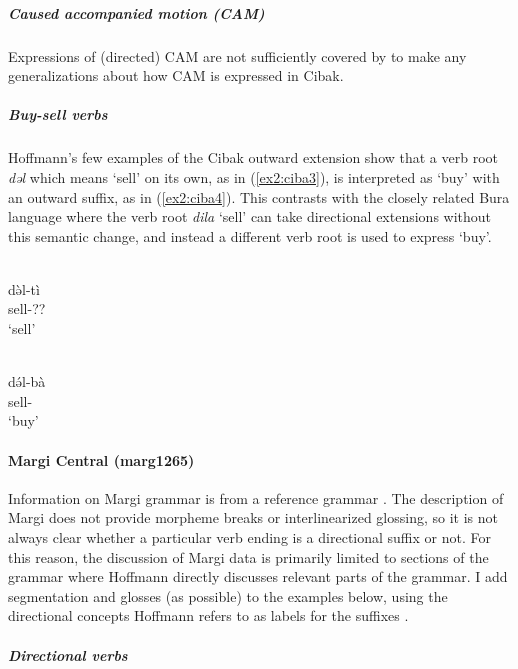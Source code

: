 \subparagraph{Caused accompanied motion (CAM)}

Expressions of (directed) CAM are not sufficiently covered by \citet{hoffmannZurSpracheCibak1955} to make any generalizations about how CAM is expressed in Cibak.

\subparagraph{Buy-sell verbs}

Hoffmann's few examples of the Cibak outward extension show that a verb root \textit{dəl} which means `sell' on its own, as in (\ref{ex2:ciba3}), is interpreted as `buy' with an outward suffix, as in (\ref{ex2:ciba4}). This contrasts with the closely related Bura language where the verb root \textit{dila} `sell' can take directional extensions without this semantic change, and instead a different verb root is used to express `buy'.

\ea\label{ex2:ciba3}
 \\
\gll də̀l-tì \\
sell-?? \\
\glt `sell'

\ex\label{ex2:ciba4}
 \\
\gll də́l-bà \\
sell- \\
\glt `buy'
\z 

\paragraph*{Margi Central (marg1265)} \label{marg}

Information on Margi grammar is from a reference grammar \citep{hoffmannGrammarMargiLanguage1963}. The description of Margi does not provide morpheme breaks or interlinearized glossing, so it is not always clear whether a particular verb ending is a directional suffix or not. For this reason, the discussion of Margi data is primarily limited to sections of the grammar where Hoffmann directly discusses relevant parts of the grammar. I add segmentation and glosses (as possible) to the examples below, using the directional concepts Hoffmann refers to as labels for the suffixes \citep[121--149]{hoffmannGrammarMargiLanguage1963}. 

\subparagraph{Directional verbs}~

